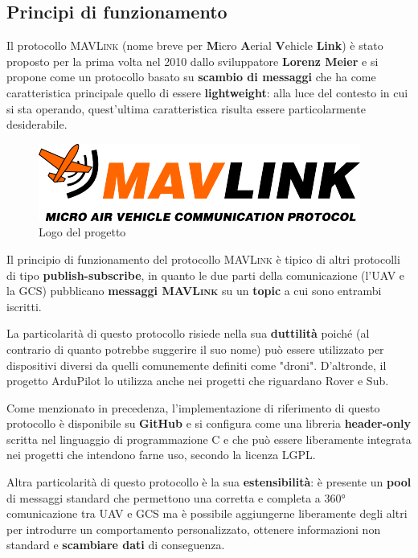 \documentclass[a4paper, 12pt, oneside]{article}
\theoremstyle{definition}
\begin{document}
\subsection{Principi di funzionamento}
Il protocollo \textsc{MAVLink} (nome breve per \textbf{M}icro \textbf{A}erial \textbf{V}ehicle \textbf{Link}) è stato proposto per la prima volta nel 2010 dallo sviluppatore \textbf{Lorenz Meier} \cite{mavlink-first-commit} e si propone come un protocollo basato su \textbf{scambio di messaggi} che ha come caratteristica principale quello di essere \textbf{lightweight}: alla luce del contesto in cui si sta operando, quest'ultima caratteristica risulta essere particolarmente desiderabile.

\begin{figure}
    \includegraphics[width=0.9\linewidth]{images/logo_mavlink_small.png}
    \caption{Logo del progetto} 
\end{figure}

Il principio di funzionamento del protocollo \textsc{MAVLink} è tipico di altri protocolli di tipo \textbf{publish-subscribe}, in quanto le due parti della comunicazione (l'UAV e la GCS) pubblicano \textbf{messaggi \textsc{MAVLink}} su un \textbf{topic} a cui sono entrambi iscritti. 

La particolarità di questo protocollo risiede nella sua \textbf{duttilità} poiché (al contrario di quanto potrebbe suggerire il suo nome) può essere utilizzato per dispositivi diversi da quelli comunemente definiti come "droni". D'altronde, il progetto ArduPilot lo utilizza anche nei progetti che riguardano Rover e Sub.

Come menzionato in precedenza, l'implementazione di riferimento di questo protocollo è disponibile su \textbf{GitHub} e si configura come una libreria \textbf{header-only} scritta nel linguaggio di programmazione C e che può essere liberamente integrata nei progetti che intendono farne uso, secondo la licenza LGPL. \cite{mavlink-c-implementation}

Altra particolarità di questo protocollo è la sua \textbf{estensibilità}: è presente un \textbf{pool} di messaggi standard che permettono una corretta e completa a 360° comunicazione tra UAV e GCS ma è possibile aggiungerne liberamente degli altri per introdurre un comportamento personalizzato, ottenere informazioni non standard e \textbf{scambiare dati} di conseguenza. 
\end{document}
